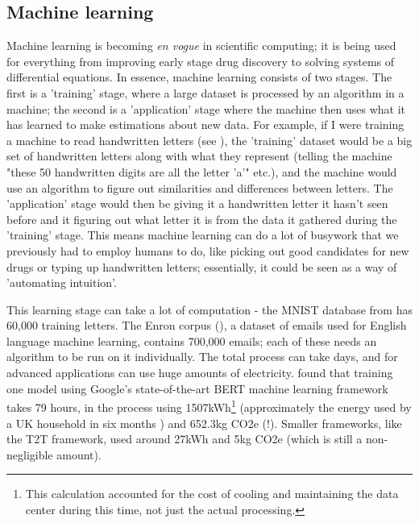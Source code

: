 \documentclass{article}
\begin{document}
\subsection{Machine learning}
Machine learning is becoming \textit{en vogue} in scientific computing; it is being used for everything from improving early stage drug discovery \citep{imrie2021generating} to solving systems of differential equations. \citep{bhattacharya2020model} In essence, machine learning consists of two stages. The first is a 'training' stage, where a large dataset is processed by an algorithm in a machine; the second is a 'application' stage where the machine then uses what it has learned to make estimations about new data. For example, if I were training a machine to read handwritten letters (see \citet{deng2012mnist}), the 'training' dataset would be a big set of handwritten letters along with what they represent (telling the machine "these 50 handwritten digits are all the letter 'a'" etc.), and the machine would use an algorithm to figure out similarities and differences between letters. The 'application' stage would then be giving it a handwritten letter it hasn't seen before and it figuring out what letter it is from the data it gathered during the 'training' stage. This means machine learning can do a lot of busywork that we previously had to employ humans to do, like picking out good candidates for new drugs or typing up handwritten letters; essentially, it could be seen as a way of 'automating intuition'. \newline

This learning stage can take a lot of computation - the MNIST database from \citet{deng2012mnist} has 60,000 training letters. The Enron corpus (\citet[see][]{klimt2004enron}), a dataset of emails used for English language machine learning, contains 700,000 emails; each of these needs an algorithm to be run on it individually. The total process can take days, and for advanced applications can use  huge amounts of electricity. \citet{strubell2019energy} found that training one model using Google's state-of-the-art BERT machine learning framework takes 79 hours, in the process using 1507kWh\footnote{This calculation accounted for the cost of cooling and maintaining the data center during this time, not just the actual processing.} (approximately the energy used by a UK household in six months \citep{waters2019energy}) and 652.3kg CO2e (!). Smaller frameworks, like the T2T framework, used around 27kWh and 5kg CO2e (which is still a non-negligible amount).\newline
\end{document}
